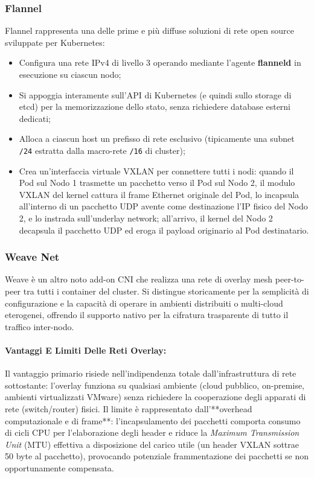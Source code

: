 \documentclass[11pt, a4paper]{article}
\begin{document}
\subsubsection{Flannel}
Flannel rappresenta una delle prime e più diffuse soluzioni di rete open source sviluppate per Kubernetes:
\begin{itemize}[noitemsep]
    \item Configura una rete IPv4 di livello 3 operando mediante l'agente \textbf{flanneld} in esecuzione su ciascun nodo;
    \item Si appoggia interamente sull'API di Kubernetes (e quindi sullo storage di etcd) per la memorizzazione dello stato, senza richiedere database esterni dedicati;
    \item Alloca a ciascun host un prefisso di rete esclusivo (tipicamente una subnet \texttt{/24} estratta dalla macro-rete \texttt{/16} di cluster);
    \item Crea un'interfaccia virtuale VXLAN per connettere tutti i nodi: quando il Pod sul Nodo 1 trasmette un pacchetto verso il Pod sul Nodo 2, il modulo VXLAN del kernel cattura il frame Ethernet originale del Pod, lo incapsula all'interno di un pacchetto UDP avente come destinazione l'IP fisico del Nodo 2, e lo instrada sull'underlay network; all'arrivo, il kernel del Nodo 2 decapsula il pacchetto UDP ed eroga il payload originario al Pod destinatario.
\end{itemize}

\subsubsection{Weave Net}
Weave è un altro noto add-on CNI che realizza una rete di overlay mesh peer-to-peer tra tutti i container del cluster. Si distingue storicamente per la semplicità di configurazione e la capacità di operare in ambienti distribuiti o multi-cloud eterogenei, offrendo il supporto nativo per la cifratura trasparente di tutto il traffico inter-nodo.

\paragraph{Vantaggi E Limiti Delle Reti Overlay:}
Il vantaggio primario risiede nell'indipendenza totale dall'infrastruttura di rete sottostante: l'overlay funziona su qualsiasi ambiente (cloud pubblico, on-premise, ambienti virtualizzati VMware) senza richiedere la cooperazione degli apparati di rete (switch/router) fisici. Il limite è rappresentato dall'**overhead computazionale e di frame**: l'incapsulamento dei pacchetti comporta consumo di cicli CPU per l'elaborazione degli header e riduce la \emph{Maximum Transmission Unit} (MTU) effettiva a disposizione del carico utile (un header VXLAN sottrae 50 byte al pacchetto), provocando potenziale frammentazione dei pacchetti se non opportunamente compensata.
\end{document}
